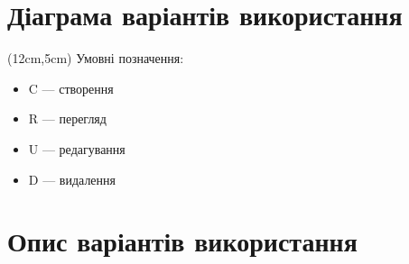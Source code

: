 \section{Діаграма варіантів використання}

\begin{flushright}
 \begin{textblock*}{5cm}(12cm,5cm)
  \footnotesize Умовні позначення:
   \begin{itemize}
    \item C --- створення
    \item R --- перегляд
    \item U --- редагування
    \item D --- видалення
   \end{itemize}
 \end{textblock*}
\end{flushright}

\scalebox{0.33}{}

\newpage

\section{Опис варіантів використання}

\newcommand{\rowspan}[2]{
 \multirow{1}{*}[
  \dimexpr#1 / 2\relax
 ]{#2}
}

\newlength{\spanHeight}
\newbox\tmpparbox

